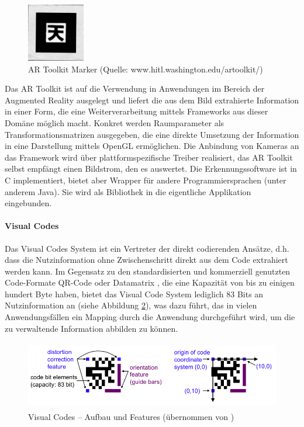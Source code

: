 \begin{figure}[htbp]
	\centering
		\includegraphics[height=1in]{img/ImplementierungInput/artoolkit.jpg}
	\caption[AR Toolkit Marker]{AR Toolkit Marker (Quelle: www.hitl.washington.edu/artoolkit/)}
	\label{fig:img_ImplementierungInput_artoolkit}
\end{figure}

Das AR Toolkit ist auf die Verwendung in Anwendungen im Bereich der Augmented Reality ausgelegt und liefert die aus dem Bild extrahierte Information in einer Form, die eine Weiterverarbeitung mittels Frameworks aus dieser Domäne möglich macht. Konkret werden Raumparameter als Transformationsmatrizen ausgegeben, die eine direkte Umsetzung der Information in eine Darstellung mittels OpenGL ermöglichen. Die Anbindung von Kameras an das Framework wird über plattformspezifische Treiber realisiert, das AR Toolkit selbst empfängt einen Bildstrom, den es auswertet. Die Erkennungssoftware ist in C implementiert, bietet aber Wrapper für andere Programmiersprachen (unter anderem Java). Sie wird als Bibliothek in die eigentliche Applikation eingebunden.


\paragraph{Visual Codes}\label{par:visualcodes}

Das Visual Codes System \citep{Rohs05} ist ein Vertreter der direkt codierenden Ansätze, d.h. dass die Nutzinformation ohne Zwischenschritt direkt aus dem Code extrahiert werden kann. Im Gegensatz zu den standardisierten und kommerziell genutzten Code-Formate QR-Code \citep{QR2008} oder Datamatrix \citep{GS108}, die eine Kapazität von bis zu einigen hundert Byte haben, bietet das Visual Code System lediglich 83 Bits an Nutzinformation an (siehe Abbildung \ref{fig:img_ImplementierungInput_visualcodes}), was dazu führt, das in vielen Anwendungsfällen ein Mapping durch die Anwendung durchgeführt wird, um die zu verwaltende Information abbilden zu können.

\begin{figure}[htbp]
	\centering
		\includegraphics[height=3cm]{img/ImplementierungInput/visualcodes.png}
	\caption[Visual Codes -- Aufbau und Features]{Visual Codes -- Aufbau und Features (übernommen von \citet{Rohs04})}
	\label{fig:img_ImplementierungInput_visualcodes}
\end{figure}


